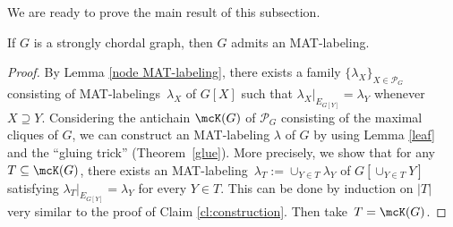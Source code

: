 We are ready to prove the main result of this subsection.
\begin{theorem}
\label{thm:main-2} 
If $ G $ is a strongly chordal graph, then $G$ admits an MAT-labeling. 
\end{theorem}
\begin{proof}
By Lemma \ref{node MAT-labeling}, there exists a family $ \{\lambda_{X}\}_{X \in \mathcal{P}_{G}} $ consisting of MAT-labelings~$ \lambda_{X} $ of $ G[X] $ such that $ \lambda_{X}|_{E_{G[Y]}} = \lambda_{Y} $ whenever $ X \supseteq Y $. 
Considering the antichain $\mcK(G)$ of $ \mathcal{P}_{G} $ consisting of the maximal cliques of $ G $, we can construct an MAT-labeling $ \lambda $ of $ G $ by using Lemma \ref{leaf} and the ``gluing trick'' (Theorem~\ref{glue}). 
More precisely, we show that for any $T \subseteq \mcK(G)$, there exists an MAT-labeling~$ \lambda_{T}:= \cup_{Y \in T} \lambda_Y$ of $ G[\cup_{Y \in T}Y] $ satisfying $ \lambda_{T}|_{E_{G[Y]}} = \lambda_{Y} $ for every $ Y \in T $. 
This can be done by induction on $ |T| $ very similar to the proof of Claim \ref{cl:construction}. 
Then take~$T = \mcK(G)$.
\end{proof}

